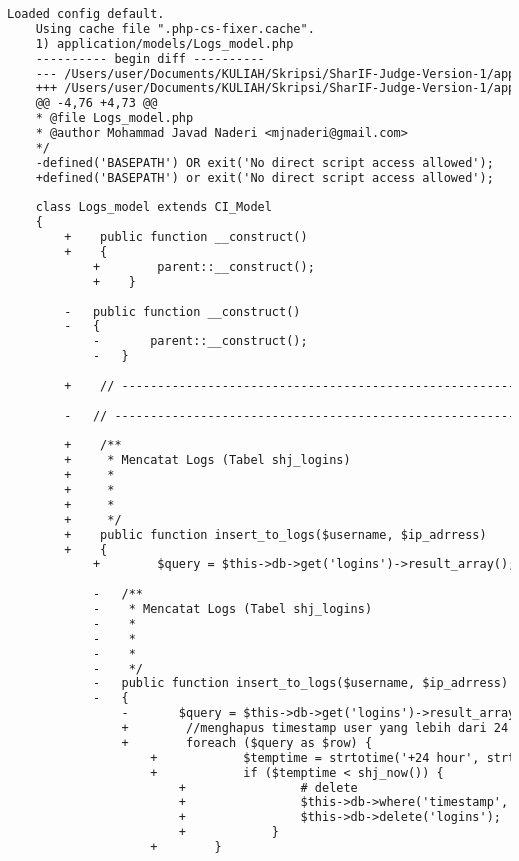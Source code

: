 \begin{lstlisting}[language=diff, caption=Perubahan pada kode Logs\_model.php]
	Loaded config default.
	Using cache file ".php-cs-fixer.cache".
	1) application/models/Logs_model.php
	---------- begin diff ----------
	--- /Users/user/Documents/KULIAH/Skripsi/SharIF-Judge-Version-1/application/models/Logs_model.php
	+++ /Users/user/Documents/KULIAH/Skripsi/SharIF-Judge-Version-1/application/models/Logs_model.php
	@@ -4,76 +4,73 @@
	* @file Logs_model.php
	* @author Mohammad Javad Naderi <mjnaderi@gmail.com>
	*/
	-defined('BASEPATH') OR exit('No direct script access allowed');
	+defined('BASEPATH') or exit('No direct script access allowed');
	
	class Logs_model extends CI_Model
	{
		+    public function __construct()
		+    {
			+        parent::__construct();
			+    }
		
		-	public function __construct()
		-	{
			-		parent::__construct();
			-	}
		
		+    // ------------------------------------------------------------------------
		
		-	// ------------------------------------------------------------------------
		
		+    /**
		+     * Mencatat Logs (Tabel shj_logins)
		+     *
		+     *
		+     *
		+     */
		+    public function insert_to_logs($username, $ip_adrress)
		+    {
			+        $query = $this->db->get('logins')->result_array();
			
			-	/**
			-	 * Mencatat Logs (Tabel shj_logins)
			-	 *
			-	 *
			-	 *
			-	 */
			-	public function insert_to_logs($username, $ip_adrress)
			-	{
				-		$query = $this->db->get('logins')->result_array();
				+        //menghapus timestamp user yang lebih dari 24 jam
				+        foreach ($query as $row) {
					+            $temptime = strtotime('+24 hour', strtotime($row['timestamp']));
					+            if ($temptime < shj_now()) {
						+                # delete
						+                $this->db->where('timestamp', $row['timestamp']);
						+                $this->db->delete('logins');
						+            }
					+        }
				

\end{lstlisting}

